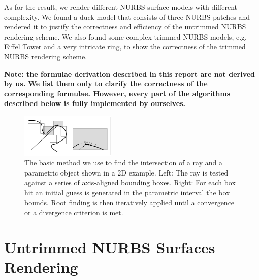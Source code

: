 \documentclass[acmtog]{acmart}
\begin{document}
As for the result, we render different NURBS surface models with different complexity. We found a duck model that consists of three NURBS patches and rendered it to justify the correctness and efficiency of the untrimmed NURBS rendering scheme. We also found some complex trimmed NURBS models, e.g. Eiffel Tower and a very intricate ring, to show the correctness of the trimmed NURBS rendering scheme.

\textbf{Note: the formulae derivation described in this report are not derived by us. We list them only to clarify the correctness of the corresponding formulae. However, every part of the algorithms described below is fully implemented by ourselves.}

\begin{figure}[t]
    \centering
    \includegraphics[width=0.4\textwidth]{overview.png}
    \caption{The basic method we use to find the intersection of a ray and a parametric object shown in a 2D example. Left: The ray is tested against a series of axis-aligned bounding boxes. Right: For each box hit an initial guess is generated in the parametric interval the box bounds. Root finding is then iteratively applied until a convergence or a divergence criterion is met.}
\end{figure}

\section{Untrimmed NURBS Surfaces Rendering}
\end{document}
